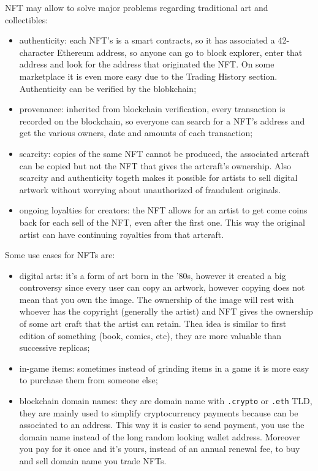 NFT may allow to solve major problems regarding traditional art and collectibles:
\begin{itemize}
    \item authenticity: each NFT's is a smart contracts, so it has associated a 42-character Ethereum address, so anyone can go to block explorer, enter that address and look for the address that originated the NFT.
    On some marketplace it is even more easy due to the Trading History section.
    Authenticity can be verified by the blobkchain;

    \item provenance: inherited from blockchain verification, every transaction is recorded on the blockchain, so everyone can search for a NFT's address and get the various owners, date and amounts of each transaction;

    \item scarcity: copies of the same NFT cannot be produced, the associated artcraft can be copied but not the NFT that gives the artcraft's ownership.
    Also scarcity and authenticity togeth makes it possible for artists to sell digital artwork without worrying about unauthorized of fraudulent originals.

    \item ongoing loyalties for creators: the NFT allows for an artist to get come coins back for each sell of the NFT, even after the first one.
    This way the original artist can have continuing royalties from that artcraft.
\end{itemize}

Some use cases for NFTs are:
\begin{itemize}
    \item digital arts: it's a form of art born in the '80s, however it created a big controversy since every user can copy an artwork, however copying does not mean that you own the image.
    The ownership of the image will rest with whoever has the copyright (generally the artist) and NFT gives the ownership of some art craft that the artist can retain.
    Thea idea is similar to first edition of something (book, comics, etc), they are more valuable than successive replicas;

    \item in-game items: sometimes instead of grinding items in a game it is more easy to purchase them from someone else;

    \item blockchain domain names: they are domain name with \verb|.crypto| or \verb|.eth| TLD, they are mainly used to simplify cryptocurrency payments because can be associated to an address.
    This way it is easier to send payment, you use the domain name instead of the long random looking wallet address.
    Moreover you pay for it once and it's yours, instead of an annual renewal fee, to buy and sell domain name you trade NFTs.
\end{itemize}

